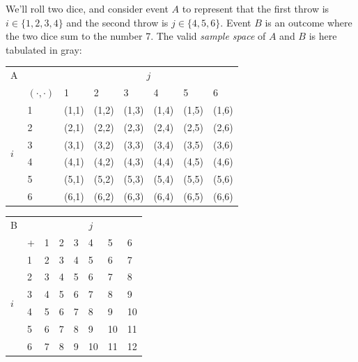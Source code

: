 \documentclass{article}
\begin{document}
\begin{testexample}
    We'll roll two dice, and consider event $A$ to represent that the first throw is $i\in\{1,2,3,4\}$ and the second throw is $j\in\{4,5,6\}$. Event $B$ is an outcome where the two dice sum to the number 7. The valid \textit{sample space} of $A$ and $B$ is here tabulated in {\color{gray} gray}:
    
\begin{center}
\hfill
    \begin{tabular}{@{}ll|llllll}
\toprule
A & & \multicolumn{6}{c}{$j$} \\ 
 & $(\cdot,\cdot)$ & 1 & 2 & 3 & \cellcolor{gray!10}4 & \cellcolor{gray!10}5 & \cellcolor{gray!10}6 \\ \hline
\multirow{6}{*}{$i$} & \cellcolor{gray!10}1 & (1,1) & (1,2) & (1,3) & \cellcolor{gray!20}(1,4) & \cellcolor{gray!20}(1,5) & \cellcolor{gray!20}(1,6) \\
 & \cellcolor{gray!10}2 & (2,1) & (2,2) & (2,3) & \cellcolor{gray!20}(2,4) & \cellcolor{gray!20}(2,5) & \cellcolor{gray!20}(2,6) \\
 & \cellcolor{gray!10}3 & (3,1) & (3,2) & (3,3) & \cellcolor{gray!20}(3,4) & \cellcolor{gray!20}(3,5) & \cellcolor{gray!20}(3,6) \\
 & \cellcolor{gray!10}4 & (4,1) & (4,2) & (4,3) & \cellcolor{gray!20}(4,4) & \cellcolor{gray!20}(4,5) & \cellcolor{gray!20}(4,6) \\
 & 5                    & (5,1) & (5,2) & (5,3) & (5,4) & (5,5) & (5,6) \\
 & 6                    & (6,1) & (6,2) & (6,3) & (6,4) & (6,5) & (6,6) \\ \bottomrule
\end{tabular}
\hfill
    \begin{tabular}{@{}ll|llllll}
\toprule
B & & \multicolumn{6}{c}{$j$} \\ 
 & + & 1 & 2 & 3 & 4 & 5 & 6 \\ \hline
\multirow{6}{*}{$i$} & 1 & 2 & 3 & 4 & 5 & 6 & \cellcolor{gray!20}7 \\
 & 2 & 3 & 4 & 5 & 6 & \cellcolor{gray!20}7 & 8 \\
 & 3 & 4 & 5 & 6 & \cellcolor{gray!20}7 & 8 & 9 \\
 & 4 & 5 & 6 & \cellcolor{gray!20}7 & 8 & 9 & 10 \\
 & 5 & 6 & \cellcolor{gray!20}7 & 8 & 9 & 10 & 11 \\
 & 6 & \cellcolor{gray!20}7 & 8 & 9 & 10 & 11 & 12 \\ \bottomrule

\end{tabular}
\end{center}
\end{testexample}
\end{document}
